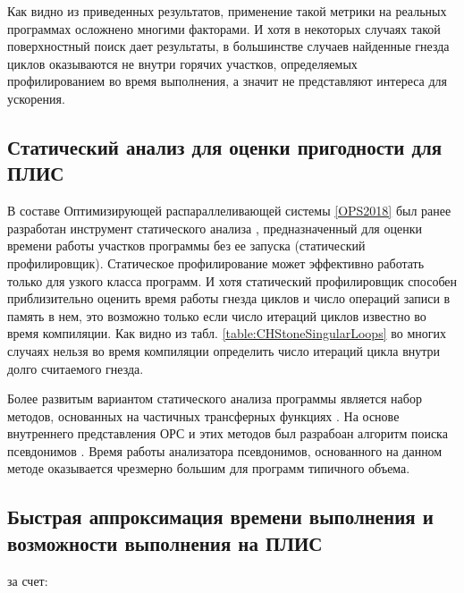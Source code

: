 \documentclass[utf8]{psta}%
\begin{document}
Как видно из приведенных результатов, применение такой метрики на реальных программах осложнено многими факторами. И хотя в некоторых случаях такой поверхностный поиск дает результаты, в большинстве случаев найденные гнезда циклов оказываются не внутри горячих участков, определяемых профилированием во время выполнения, а значит не представляют интереса для ускорения.

\subsection{Статический анализ для оценки пригодности для ПЛИС}

В составе Оптимизирующей распараллеливающей системы \ref{OPS2018} был ранее разработан инструмент статического анализа \cite{2010}, предназначенный для оценки времени работы участков программы без ее запуска (статический профилировщик). Статическое профилирование может эффективно работать только для узкого класса программ. И хотя статический профилировщик способен приблизительно оценить время работы гнезда циклов и число операций записи в память в нем, это возможно только если число итераций циклов известно во время компиляции. Как видно из табл. \ref{table:CHStoneSingularLoops} во многих случаях нельзя во время компиляции определить число итераций цикла внутри долго считаемого гнезда.

Более развитым вариантом статического анализа программы является набор методов, основанных на частичных трансферных функциях \cite{PartialTransferFunctions}. На основе внутреннего представления ОРС и этих методов был разрабоан алгоритм поиска псевдонимов \cite{Poluyan2010}. Время работы анализатора псевдонимов, основанного на данном методе оказывается чрезмерно большим для программ типичного объема.




\subsection{Быстрая аппроксимация времени выполнения и возможности выполнения на ПЛИС} 

\cite{Sherwood2002}

за счет:
\end{document}
